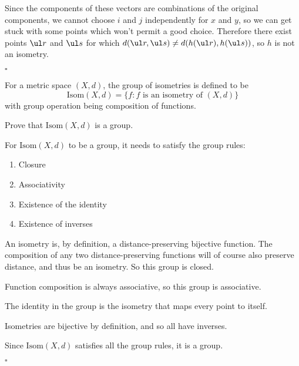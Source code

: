 \documentclass[a4paper]{article}
\begin{document}
Since the components of these vectors are combinations of the original components, we cannot choose $i$ and $j$ independently for $x$ and $y$, so we can get stuck with some points which won't permit a good choice. Therefore there exist points $\ul r$ and $\ul s$ for which $d(\ul r, \ul s) \ne d(h(\ul r), h(\ul s))$, so $h$ is not an isometry.

\hfill $\square$



\begin{questionbody}
For a metric space $(X, d)$, the group of isometries is defined to be \[
\mathrm{Isom}(X, d) = \{ f : f \text{ is an isometry of } (X, d) \}
\] with group operation being composition of functions.

Prove that $\mathrm{Isom}(X, d)$ is a group.
\end{questionbody}

For $\mathrm{Isom}(X, d)$ to be a group, it needs to satisfy the group rules:
\begin{enumerate}[1.]
\item Closure
\item Associativity
\item Existence of the identity
\item Existence of inverses
\end{enumerate}

An isometry is, by definition, a distance-preserving bijective function. The composition of any two distance-preserving functions will of course also preserve distance, and thus be an isometry. So this group is closed.

Function composition is always associative, so this group is associative.

The identity in the group is the isometry that maps every point to itself.

Isometries are bijective by definition, and so all have inverses.

Since $\mathrm{Isom}(X, d)$ satisfies all the group rules, it is a group.

\hfill $\square$
\end{document}
